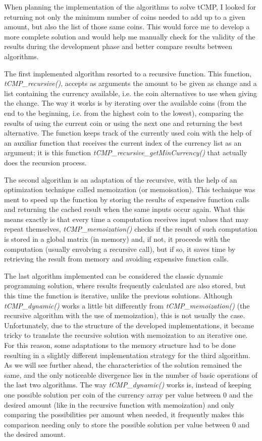 \documentclass[shortpaper]{revdetua}
\begin{document}
When planning the implementation of the algorithms to solve tCMP, I looked for
returning not only the minimum number of coins needed to add up to a given 
amount, but also the list of those same coins.
This would force me to develop a more complete solution and would help me 
manually check for the validity of the results during the development phase 
and better compare results between algorithms.

The first implemented algorithm resorted to a recursive function.
This function, {\it tCMP\_recursive()\/}, accepts as arguments the amount to be
given as change and a list containing the currency available, i.e. the coin 
alternatives to use when giving the change.
The way it works is by iterating over the available coins (from the end to the 
beginning, i.e. from the highest coin to the lowest), comparing the results 
of using the current coin or using the next one and returning the best alternative.
The function keeps track of the currently used coin with the help of an auxiliar
function that receives the current index of the currency list as an argument; it
is this function {\it tCMP\_recursive\_getMinCurrency()\/} that actually does 
the recursion process.

The second algorithm is an adaptation of the recursive, with the help of an
optimization technique called memoization (or memoisation).
This technique was ment to speed up the function by storing the results of 
expensive function calls and returning the cached result when the same inputs 
occur again.
What this means exactly is that every time a computation receives input values 
that may repeat themselves, {\it tCMP\_memoization()\/} checks if the result of 
such computation is stored in a global matrix (in memory) and, if not, it 
proceeds with the computation (usually envolving a recursive call), but if so, 
it saves time by retrieving the result from memory and avoiding expensive 
function calls.

The last algorithm implemented can be considered the classic dynamic programming
solution, where results frequently calculated are also stored, but this time the 
function is iterative, unlike the previous solutions.
Although {\it tCMP\_dynamic()\/} works a little bit differently from 
{\it tCMP\_memoization()\/} (the recursive algorithm with the use of 
memoization), this is not usually the case.
Unfortunately, due to the structure of the developed implementations, it became 
tricky to translate the recursive solution with memoization to an iterative one.
For this reason, some adaptations to the memory structure had to be done 
resulting in a slightly different implementation strategy for the third algorithm.
As we will see further ahead, the characteristics of the solution remained the 
same, and the only noticeable divergence lies in the number of basic operations
of the last two algorithms.
The way {\it tCMP\_dynamic()\/} works is, instead of keeping one possible 
solution per coin of the currency array per value between 0 and the desired
amount (like in the recursive function with memoization) and only comparing 
the possibilities per amount when needed, it frequently makes this comparison
needing only to store the possible solution per value between 0 and the desired
amount.
\end{document}
